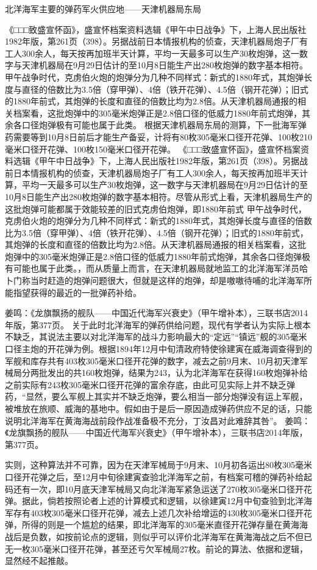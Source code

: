 \documentclass[12pt,UTF8]{ctexbook}
\begin{document}
北洋海军主要的弹药军火供应地——天津机器局东局

《□□□致盛宣怀函》，盛宣怀档案资料选辑《甲午中日战争》下，上海人民出版社1982年版，第261页（398）。另据战前日本情报机构的侦查，天津机器局炮子厂有工人300余人，每天按再加班半天计算，平均一天最多可以生产30枚炮弹，这一数字与天津机器局在9月29日估计的至10月8日能生产出280枚炮弹的数字基本相符。
甲午战争时代，克虏伯火炮的炮弹分为几种不同样式：新式的1880年式，其炮弹长度与直径的倍数比为3.5倍（穿甲弹）、4倍（铁开花弹）、4.5倍（钢开花弹）；旧式的1880年前式，其炮弹的长度和直径的倍数比均为2.8倍。从天津机器局通报的相关档案看，这批炮弹中的305毫米炮弹正是2.8倍口径的低威力1880年前式炮弹，其余各口径炮弹极有可能也属于此类。
根据天津机器局东局的测算，下一批海军弹药需要等到10月8日前后才能生产备妥，计将有80枚305毫米口径开花弹、100枚210毫米口径开花弹、100枚150毫米口径开花弹。 《□□□致盛宣怀函》，盛宣怀档案资料选辑《甲午中日战争》下，上海人民出版社1982年版，第261页（398）。另据战前日本情报机构的侦查，天津机器局炮子厂有工人300余人，每天按再加班半天计算，平均一天最多可以生产30枚炮弹，这一数字与天津机器局在9月29日估计的至10月8日能生产出280枚炮弹的数字基本相符。尽管从形式上看，天津机器局生产的这批炮弹可能都属于效能较差的旧式克虏伯炮弹，即1880年前式 甲午战争时代，克虏伯火炮的炮弹分为几种不同样式：新式的1880年式，其炮弹长度与直径的倍数比为3.5倍（穿甲弹）、4倍（铁开花弹）、4.5倍（钢开花弹）；旧式的1880年前式，其炮弹的长度和直径的倍数比均为2.8倍。从天津机器局通报的相关档案看，这批炮弹中的305毫米炮弹正是2.8倍口径的低威力1880年前式炮弹，其余各口径炮弹极有可能也属于此类。，而从质量上而言，在天津机器局就地监工的北洋海军洋员哈卜门称当时赶造的炮弹问题很大，但就是这样的炮弹，却是嗷嗷待哺的北洋海军所能指望获得的最近的一批弹药补给。

姜鸣：《龙旗飘扬的舰队——中国近代海军兴衰史》（甲午增补本），三联书店2014年版，第377页。
关于此时北洋海军的弹药供给问题，现代有学者认为实际上根本不缺乏，其说法主要以对北洋海军的战斗力影响最大的“定远”“镇远”舰的305毫米口径主炮的开花弹为例。根据1894年12月中旬清政府特使徐建寅在威海调查得到的军舰和库存共有403枚305毫米口径开花弹的数字，减去之前9月末、10月初天津军械局分两批发出的共160枚炮弹，结果为243，认为北洋海军在获得160枚炮弹补给之前实际有243枚305毫米口径开花弹的富余存底，由此可见实际上并不缺乏弹药，“显然，要么军舰上其实并不缺乏炮弹，要么相当一部分炮弹没有运上军舰，被堆放在旅顺、威海的基地中。假如由于是后一原因造成弹药供应不足的话，只能说明北洋海军在黄海海战前段作战准备极不充分，丁汝昌对此难辞其咎”。 姜鸣：《龙旗飘扬的舰队——中国近代海军兴衰史》（甲午增补本），三联书店2014年版，第377页。

实则，这种算法并不可靠，因为在天津军械局于9月末、10月初各运出80枚305毫米口径开花弹之后，至12月中旬徐建寅查验北洋海军之前，有档案可稽的弹药补给起码还有一次，即10月底天津军械局又向北洋海军紧急运送了270枚305毫米口径开花弹。据此，倘若按照论者上述的计算模式和逻辑，以徐建寅12月中旬查验到北洋海军存有403枚305毫米口径开花弹，减去上述几次补给增运的430枚305毫米口径开花弹，所得的则是一个尴尬的结果，即北洋海军的305毫米直径开花弹存量在黄海海战后是负数，如按前论点的逻辑，则似乎可以评价北洋海军在黄海海战之后不但已无一枚305毫米口径开花弹，甚至还亏欠军械局27枚。前论的算法、依据和逻辑，显然经不起推敲。
\end{document}
